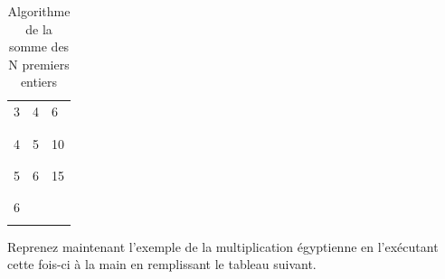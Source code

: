 \documentclass[11pt,a4paper]{article}
\begin{document}
\begin{table}[!ht]
\begin{minipage}{0.4\textwidth}
\begin{tabular}{|C{1cm}|C{1cm}|C{1cm}|}
        3    &  4 &  6    \\
             &    &       \\
        \hline
             &    &       \\
        4    &  5 &  10   \\
             &    &       \\
        \hline
             &    &       \\
        5    &  6 &  15   \\
             &    &       \\
        \hline
             &    &       \\
        6    &    &       \\
             &    &       \\
        \hline
    \end{tabular}
  \end{minipage}
  \caption{Algorithme de la somme des N premiers entiers}
  \label{somme-n-premiers-entiers}
\end{table}


\vfillLast

\newpage

\vfillFirst


Reprenez maintenant l'exemple de la multiplication égyptienne en l'exécutant cette fois-ci à la main en remplissant le tableau suivant.



\bigskip
\end{document}
